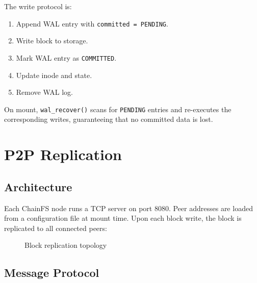 \documentclass[10pt,twocolumn]{article}
\begin{document}
The write protocol is:

\begin{enumerate}[leftmargin=*, label=\arabic*.]
    \item Append WAL entry with
    \texttt{committed = PENDING}.
    \item Write block to storage.
    \item Mark WAL entry as
    \texttt{COMMITTED}.
    \item Update inode and state.
    \item Remove WAL log.
\end{enumerate}

On mount, \texttt{wal\_recover()} scans
for \texttt{PENDING} entries and
re-executes the corresponding writes,
guaranteeing that no committed data
is lost.

\section{P2P Replication}

\subsection{Architecture}

Each ChainFS node runs a TCP server
on port 8080.
Peer addresses are loaded from a
configuration file at mount time.
Upon each block write, the block is
replicated to all connected peers:

\begin{figure}[H]
\centering
{}
\caption{Block replication topology}
\end{figure}

\subsection{Message Protocol}
\end{document}
